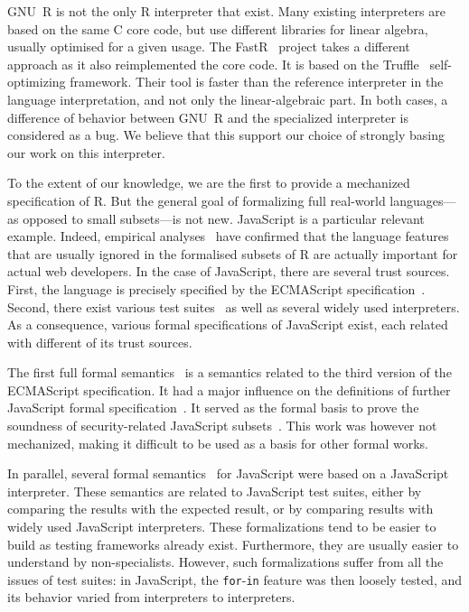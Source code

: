 \documentclass[
    sigplan,
    10pt,
    review, %
    natbib=false %
 ]{acmart}
\begin{document}
GNU~R is not the only R interpreter that exist.
Many existing interpreters are based on the same C core code,
but use different libraries for linear algebra,
usually optimised for a given usage.
%
The FastR~\parencite{kalibera2014fast} project takes a different approach
as it also reimplemented the core code.
It is based on the Truffle~\parencite{wuerthingertruffle}
self-optimizing framework.
Their tool is faster than the reference interpreter
in the language interpretation, and not only the linear-algebraic part.
%
In both cases, a difference of behavior between GNU~R
and the specialized interpreter is considered as a bug.
We believe that this support our choice of strongly basing
our work on this interpreter.

To the extent of our knowledge,
we are the first to provide a mechanized specification of R.
But the general goal of formalizing full real-world languages---%
as opposed to small subsets---is not new.
%
JavaScript is a particular relevant example.
Indeed, empirical analyses~\parencite{RichardsHBV11}
have confirmed that the language features
that are usually ignored in the formalised subsets of R
are actually important for actual web developers.
%
In the case of JavaScript, there are several trust sources.
First, the language is precisely specified by the ECMAScript specification~\parencite{es2019}.
Second, there exist various test suites~\parencite{test262, mozillatests}
as well as several widely used interpreters.
As a consequence, various formal specifications of JavaScript exist,
each related with different of its trust sources.

The first full formal semantics~\parencite{aplas08}
is a semantics related to the third version of the ECMAScript specification.
It had a major influence on the definitions of further JavaScript formal
specification~\parencite{ses, popl14jscert, popl12-Towards, usenix}.
It served as the formal basis to prove the soundness of security-related
JavaScript subsets~\parencite{MMT-CSF-TR09, mmt-esorics09, mmt-oakland10}.
This work was however not mechanized, making it difficult to be used
as a basis for other formal works.

In parallel, several formal semantics~\parencite{js-ml, Guha2010, Politz:S5, kjs}
for JavaScript were based on a JavaScript interpreter.
These semantics are related to JavaScript test suites,
either by comparing the results with the expected result,
or by comparing results with widely used JavaScript interpreters.
These formalizations tend to be easier to build
as testing frameworks already exist.
Furthermore, they are usually easier to understand by non-specialists.
However, such formalizations suffer from all the issues of test suites:
in JavaScript, the \texttt{for}-\texttt{in}
feature was then loosely tested,
and its behavior varied from interpreters to interpreters.
\end{document}
